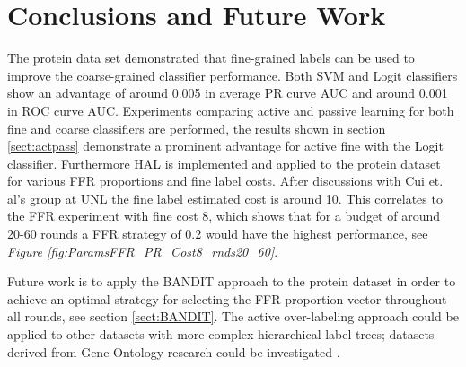 \documentclass[ms]{nuthesis}
\begin{document}



\chapter{Conclusions and Future Work}
\par The protein data set demonstrated that fine-grained labels can be used
to improve the coarse-grained classifier performance. Both SVM and Logit
classifiers show an advantage of around 0.005 in average PR curve AUC and around
0.001 in ROC curve AUC. Experiments comparing active and passive learning for both
fine and coarse classifiers are performed, the results shown in section \ref{sect:actpass}
demonstrate a prominent advantage for active fine with the Logit classifier. Furthermore
 HAL is implemented and applied to the protein dataset for various FFR proportions and
 fine label costs. After discussions with Cui et. al's group at UNL \cite{bioPoster} the fine label
 estimated cost is around 10. This correlates to the FFR experiment with fine cost 8, which shows
 that for a budget of around 20-60 rounds a FFR strategy of 0.2 would have the highest performance,
 see \textit{Figure \ref{fig:ParamsFFR_PR_Cost8_rnds20_60}}.
 \par Future work is to apply the BANDIT approach to the protein dataset in order to achieve
 an optimal strategy for selecting the FFR proportion vector throughout all rounds, see
 section \ref{sect:BANDIT}. The active over-labeling approach could be applied to other
 datasets with more complex hierarchical label trees; datasets derived from
 Gene Ontology research could be investigated \cite{GeneOntology}.



\backmatter

%

%


\nocite{*}


\end{document}
